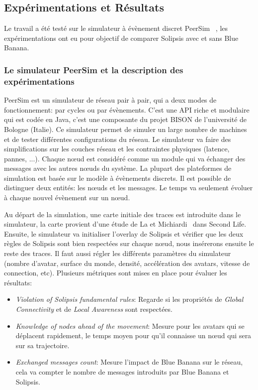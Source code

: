 	\subsection{Expérimentations et Résultats}
		Le travail a été testé sur le simulateur à évènement discret PeerSim ~\cite{peersim}, les expérimentations ont eu pour objectif de comparer Solipsis avec et sans Blue Banana.
		\subsubsection{Le simulateur PeerSim et la description des expérimentations}
		\par PeerSim est un simulateur de réseau pair à pair, qui a deux modes de fonctionnement: par cycles ou par évènements. C'est une API riche et modulaire qui est codée en Java, c'est une composante du projet BISON de l'université de Bologne (Italie). Ce simulateur permet de simuler un large nombre de machines et de tester différentes configurations du réseau. Le simulateur va faire des simplifications sur les couches réseau et les contraintes physiques (latence, pannes, ...). Chaque nœud est considéré comme un module qui va échanger des messages avec les autres nœuds du système. La plupart des plateformes de simulation est basée sur le modèle à évènements discrets. Il est possible de distinguer deux entités: les nœuds et les messages. Le temps va seulement évoluer à chaque nouvel évènement sur un nœud.
		\par Au départ de la simulation, une carte initiale des traces est introduite dans le simulateur, la carte provient d'une étude de La et Michiardi~\cite{LM-wosn08} dans Second Life. Ensuite, le simulateur va initialiser l'overlay de Solipsis et vérifier que les deux règles de Solipsis sont bien respectées sur chaque nœud, nous insérerons ensuite le reste des traces. Il faut aussi régler les différents paramètres du simulateur (nombre d'avatar, surface du monde, densité, accélération des avatars, vitesse de connection, etc). Plusieurs métriques sont mises en place pour évaluer les résultats:
	\begin{itemize}
	\renewcommand{\labelitemi}{$\bullet$}
		\item \textit{Violation of Solipsis fundamental rules}: Regarde si les propriétés de \textit{Global Connectivity} et de \textit{Local Awareness} sont respectées.
		\item \textit{Knowledge of nodes ahead of the movement}: Mesure pour les avatars qui se déplacent rapidement, le temps moyen pour qu'il connaisse un nœud qui sera sur sa trajectoire.
		\item \textit{Exchanged messages count}: Mesure l'impact de Blue Banana sur le réseau, cela va compter le nombre de messages introduits par Blue Banana et Solipsis.
	\end{itemize}

